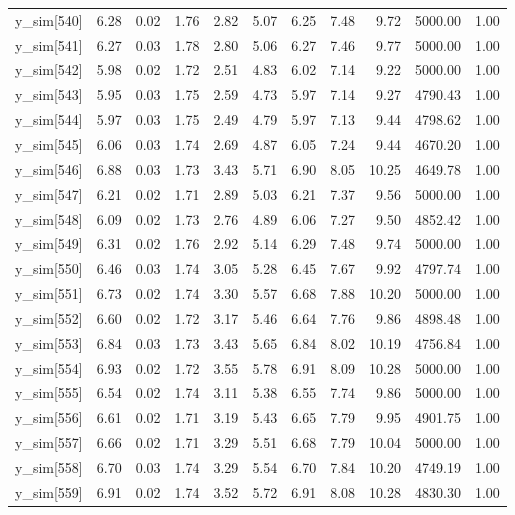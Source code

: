 \begin{table}[ht]
\begin{tabular}{rrrrrrrrrrr}
  y\_sim[540] & 6.28 & 0.02 & 1.76 & 2.82 & 5.07 & 6.25 & 7.48 & 9.72 & 5000.00 & 1.00 \\ 
  y\_sim[541] & 6.27 & 0.03 & 1.78 & 2.80 & 5.06 & 6.27 & 7.46 & 9.77 & 5000.00 & 1.00 \\ 
  y\_sim[542] & 5.98 & 0.02 & 1.72 & 2.51 & 4.83 & 6.02 & 7.14 & 9.22 & 5000.00 & 1.00 \\ 
  y\_sim[543] & 5.95 & 0.03 & 1.75 & 2.59 & 4.73 & 5.97 & 7.14 & 9.27 & 4790.43 & 1.00 \\ 
  y\_sim[544] & 5.97 & 0.03 & 1.75 & 2.49 & 4.79 & 5.97 & 7.13 & 9.44 & 4798.62 & 1.00 \\ 
  y\_sim[545] & 6.06 & 0.03 & 1.74 & 2.69 & 4.87 & 6.05 & 7.24 & 9.44 & 4670.20 & 1.00 \\ 
  y\_sim[546] & 6.88 & 0.03 & 1.73 & 3.43 & 5.71 & 6.90 & 8.05 & 10.25 & 4649.78 & 1.00 \\ 
  y\_sim[547] & 6.21 & 0.02 & 1.71 & 2.89 & 5.03 & 6.21 & 7.37 & 9.56 & 5000.00 & 1.00 \\ 
  y\_sim[548] & 6.09 & 0.02 & 1.73 & 2.76 & 4.89 & 6.06 & 7.27 & 9.50 & 4852.42 & 1.00 \\ 
  y\_sim[549] & 6.31 & 0.02 & 1.76 & 2.92 & 5.14 & 6.29 & 7.48 & 9.74 & 5000.00 & 1.00 \\ 
  y\_sim[550] & 6.46 & 0.03 & 1.74 & 3.05 & 5.28 & 6.45 & 7.67 & 9.92 & 4797.74 & 1.00 \\ 
  y\_sim[551] & 6.73 & 0.02 & 1.74 & 3.30 & 5.57 & 6.68 & 7.88 & 10.20 & 5000.00 & 1.00 \\ 
  y\_sim[552] & 6.60 & 0.02 & 1.72 & 3.17 & 5.46 & 6.64 & 7.76 & 9.86 & 4898.48 & 1.00 \\ 
  y\_sim[553] & 6.84 & 0.03 & 1.73 & 3.43 & 5.65 & 6.84 & 8.02 & 10.19 & 4756.84 & 1.00 \\ 
  y\_sim[554] & 6.93 & 0.02 & 1.72 & 3.55 & 5.78 & 6.91 & 8.09 & 10.28 & 5000.00 & 1.00 \\ 
  y\_sim[555] & 6.54 & 0.02 & 1.74 & 3.11 & 5.38 & 6.55 & 7.74 & 9.86 & 5000.00 & 1.00 \\ 
  y\_sim[556] & 6.61 & 0.02 & 1.71 & 3.19 & 5.43 & 6.65 & 7.79 & 9.95 & 4901.75 & 1.00 \\ 
  y\_sim[557] & 6.66 & 0.02 & 1.71 & 3.29 & 5.51 & 6.68 & 7.79 & 10.04 & 5000.00 & 1.00 \\ 
  y\_sim[558] & 6.70 & 0.03 & 1.74 & 3.29 & 5.54 & 6.70 & 7.84 & 10.20 & 4749.19 & 1.00 \\ 
  y\_sim[559] & 6.91 & 0.02 & 1.74 & 3.52 & 5.72 & 6.91 & 8.08 & 10.28 & 4830.30 & 1.00 \\ 

\end{tabular}
\end{table}
